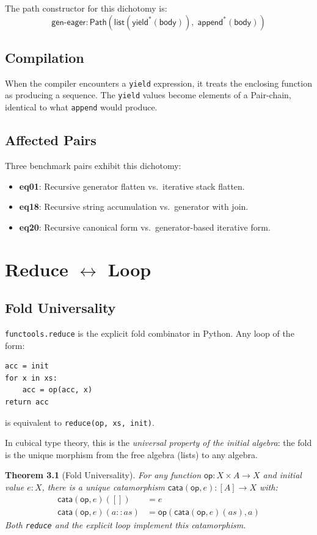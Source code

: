 \documentclass[11pt,a4paper]{report}
\theoremstyle{definition}
\theoremstyle{plain}
\newtheorem{theorem}[definition]{Theorem}
\newcommand{\Path}{\mathsf{Path}}
\newcommand{\cata}{\mathsf{cata}}
\begin{document}
The path constructor for this dichotomy is:
\[
  \mathsf{gen\text{-}eager} : \Path(\mathsf{list}(\mathsf{yield}^*(
    \mathsf{body})),\; \mathsf{append}^*(\mathsf{body}))
\]

\section{Compilation}

When the compiler encounters a \texttt{yield} expression, it
treats the enclosing function as producing a sequence.  The
\texttt{yield} values become elements of a Pair-chain, identical
to what \texttt{append} would produce.

\section{Affected Pairs}

Three benchmark pairs exhibit this dichotomy:
\begin{itemize}
  \item \textbf{eq01}: Recursive generator flatten vs.\ iterative
    stack flatten.
  \item \textbf{eq18}: Recursive string accumulation vs.\ generator
    with join.
  \item \textbf{eq20}: Recursive canonical form vs.\ generator-based
    iterative form.
\end{itemize}


\chapter{Reduce $\leftrightarrow$ Loop}
\label{ch:reduce-loop}

\section{Fold Universality}

\texttt{functools.reduce} is the explicit fold combinator in Python.
Any loop of the form:
\begin{lstlisting}
acc = init
for x in xs:
    acc = op(acc, x)
return acc
\end{lstlisting}
is equivalent to \texttt{reduce(op, xs, init)}.

In cubical type theory, this is the \emph{universal property of the
initial algebra}: the fold is the unique morphism from the free
algebra (lists) to any algebra.

\begin{theorem}[Fold Universality]
For any function $\mathsf{op} : X \times A \to X$ and initial value
$e : X$, there is a unique catamorphism
$\cata(\mathsf{op}, e) : [A] \to X$ with:
\begin{align}
  \cata(\mathsf{op}, e)([]) &= e \\
  \cata(\mathsf{op}, e)(a :: as) &= \mathsf{op}(\cata(\mathsf{op}, e)(as), a)
\end{align}
Both \texttt{reduce} and the explicit loop implement this catamorphism.
\end{theorem}
\end{document}
